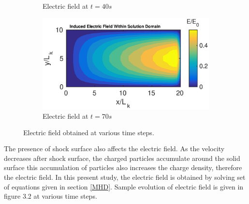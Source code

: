 \documentclass[12pt]{report}
\begin{document}
\begin{figure}[h!]
\begin{subfigure}[b]{0.5\textwidth}
        \caption{Electric field at $t=40s$}
    \end{subfigure}%
   \begin{subfigure}[b]{0.5\textwidth}
        \includegraphics[width=1.\textwidth]{EFinal.eps}
        \caption{Electric field at $t=70s$}
    \end{subfigure}
    \caption{Electric field obtained at various time steps.}
\end{figure}
The presence of shock surface also affects the electric field. As the velocity decreases after shock surface, the charged particles accumulate around the solid surface this accumulation of particles also increases the charge density, therefore the electric field. In this present study, the electric field is obtained by solving set of equations given in section \ref{MHD}. Sample evolution of electric field is given in figure 3.2 at various time steps.
\end{document}

